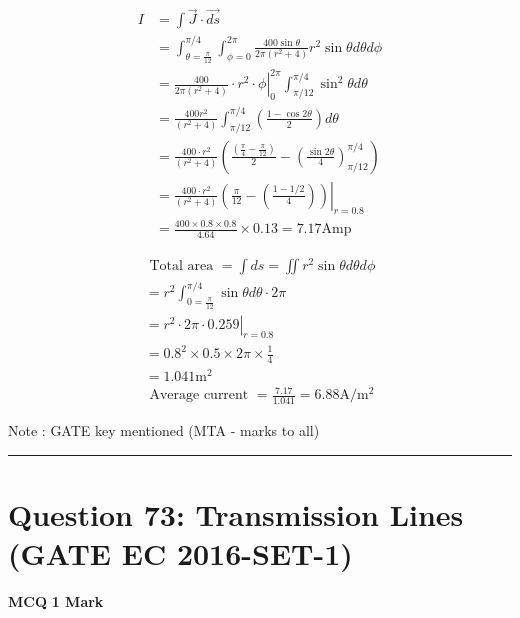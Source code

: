 \documentclass[11pt,a4paper]{article}
\begin{document}
\begin{tcolorbox}[solbox, title=Detailed Solution -- Question 72]
\[
\begin{aligned} I &=\int \overrightarrow{J} \cdot \overrightarrow{d s} \\ &=\int_{\theta=\frac{\pi}{12}}^{\pi / 4} \int_{\phi=0}^{2 \pi} \frac{400 \sin \theta}{2 \pi\left(r^{2}+4\right)} r^{2} \sin \theta d \theta d \phi \\ &=\left.\frac{400}{2 \pi\left(r^{2}+4\right)} \cdot r^{2} \cdot \phi\right|_{0} ^{2 \pi} \int_{\pi / 12}^{\pi / 4} \sin ^{2} \theta d \theta \\ &=\frac{400 r^{2}}{\left(r^{2}+4\right)} \int_{\pi / 12}^{\pi / 4}\left(\frac{1-\cos 2 \theta}{2}\right) d \theta \\ &=\frac{400 \cdot r^{2}}{\left(r^{2}+4\right)}\left(\frac{\left(\frac{\pi}{4}-\frac{\pi}{12}\right)}{2}-\left(\frac{\sin 2 \theta}{4}\right)_{\pi / 12}^{\pi / 4}\right) \\ &=\left.\frac{400 \cdot r^{2}}{\left(r^{2}+4\right)}\left(\frac{\pi}{12}-\left(\frac{1-1 / 2}{4}\right)\right)\right|_{r=0.8} \\ &=\frac{400 \times 0.8 \times 0.8}{4.64} \times 0.13=7.17 \mathrm{Amp} \end{aligned}
\]

\[
\begin{array}{l} \text { Total area }=\int d s=\iint r^{2} \sin \theta d \theta d \phi \\ =r^{2} \int_{0=\frac{\pi}{12}}^{\pi / 4} \sin \theta d \theta \cdot 2 \pi \\ =\left.r^{2} \cdot 2 \pi \cdot 0.259\right|_{r=0.8} \\ =0.8^{2} \times 0.5 \times 2 \pi \times \frac{1}{4} \\ =1.041 \mathrm{m}^{2} \\ \text { Average current }=\frac{7.17}{1.041}=6.88 \mathrm{A} / \mathrm{m}^{2} \end{array}
\]

 Note : GATE key mentioned (MTA - marks to all)
\end{tcolorbox}

\vspace{1.5em}
\hrule
\vspace{1.5em}

\section*{Question 73: Transmission Lines (GATE EC 2016-SET-1)}
\noindent \textbf{\color{primary}MCQ} \hfill \textbf{\color{secondary}1 Mark}
\end{document}

